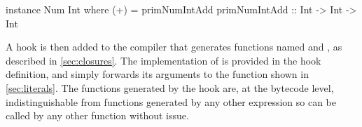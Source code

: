 \documentclass[dissertation.tex]{subfiles}
\begin{document}
{{{            \begin{haskellfigure}
            instance Num Int where
                (+) = primNumIntAdd
            primNumIntAdd :: Int -> Int -> Int
            \end{haskellfigure}

            A hook is then added to the compiler that generates functions named  and
            , as described in \ref{sec:closures}. The implementation of
             is provided in the hook definition, and simply forwards its arguments to the
             function shown in \ref{sec:literals}. The functions generated by the hook are, at the
            bytecode level, indistinguishable from functions generated by any other expression so can be called by any
            other function without issue.



        }
    }
}
\end{document}
